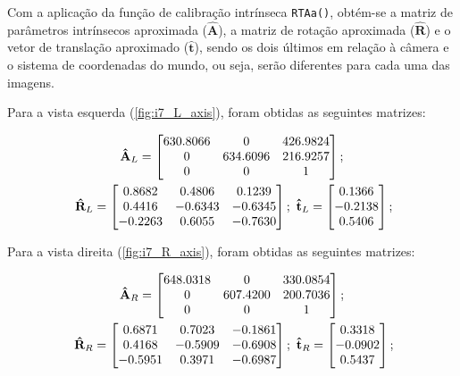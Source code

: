 Com a aplicação da função de calibração intrínseca \texttt{RTAa()}, obtém-se a matriz de parâmetros intrínsecos aproximada ($\mathbf{\hat{A}}$), a matriz de rotação aproximada ($\mathbf{\hat{R}}$) e o vetor de translação aproximado ($\mathbf{\hat{t}}$), sendo os dois últimos em relação à câmera e o sistema de coordenadas do mundo, ou seja, serão diferentes para cada uma das imagens.

Para a vista esquerda (\autoref{fig:i7_L_axis}), foram obtidas as seguintes matrizes:

\begin{gather}\label{eq:ve}
\mathbf{\hat{A}}_L = \begin{bmatrix}
	630.8066 & 0        & 426.9824 \\
	0        & 634.6096 & 216.9257 \\
	0        & 0        & 1  
\end{bmatrix}; \\ \ \mathbf{\hat{R}}_L = \begin{bmatrix}
	0.8682  & 0.4806  & 0.1239  \\
	0.4416  & -0.6343 & -0.6345 \\
	-0.2263 & 0.6055  & -0.7630
\end{bmatrix}; \ \mathbf{\hat{t}}_L = \begin{bmatrix}
	0.1366 \\
	-0.2138 \\
	0.5406
\end{bmatrix};  \label{eq:rtL}
\end{gather}

Para a vista direita (\autoref{fig:i7_R_axis}), foram obtidas as seguintes matrizes:

\begin{gather}\label{eq:vd}
	\mathbf{\hat{A}}_R = \begin{bmatrix}
	648.0318 & 0        & 330.0854 \\
	0        & 607.4200 & 200.7036 \\
	0        & 0        & 1
	\end{bmatrix}; \\ \ \mathbf{\hat{R}}_R = \begin{bmatrix}
	0.6871  & 0.7023  & -0.1861 \\
	0.4168  & -0.5909 & -0.6908 \\
	-0.5951 & 0.3971  & -0.6987
	\end{bmatrix}; \ \mathbf{\hat{t}}_R = \begin{bmatrix}
	0.3318 \\
	-0.0902 \\
	0.5437
	\end{bmatrix}; \label{eq:rtR}
\end{gather}


